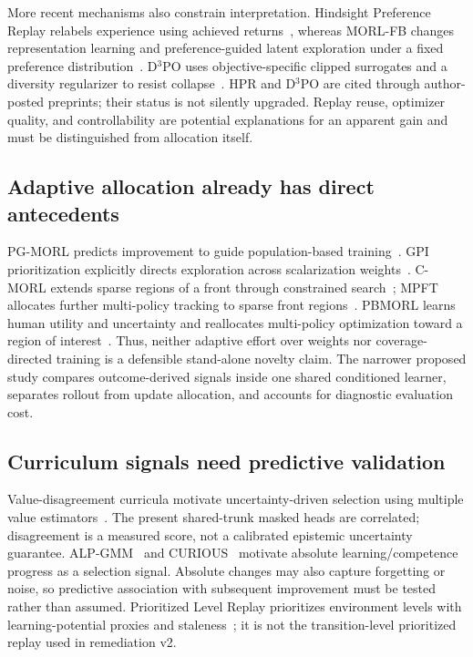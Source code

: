 More recent mechanisms also constrain interpretation. Hindsight Preference
Replay relabels experience using achieved returns~\cite{shianifar2026hpr},
whereas MORL-FB changes representation learning and preference-guided latent
exploration under a fixed preference distribution~\cite{chen2026morl-fb}.
D$^3$PO uses objective-specific clipped surrogates and a diversity regularizer
to resist collapse~\cite{ambadkar2026d3po}. HPR and D$^3$PO are cited through
author-posted preprints; their status is not silently upgraded. Replay reuse,
optimizer quality, and controllability are potential explanations for an
apparent gain and must be distinguished from allocation itself.

\subsection{Adaptive allocation already has direct antecedents}
PG-MORL predicts improvement to guide population-based training~\cite{xu2020pgmorl}.
GPI prioritization explicitly directs exploration across scalarization
weights~\cite{alegre2023gpi-prioritization}. C-MORL extends sparse regions of a
front through constrained search~\cite{liu2025cmorl}; MPFT allocates further
multi-policy tracking to sparse front regions~\cite{zhao2026mpft}.
PBMORL learns human utility and uncertainty and reallocates multi-policy
optimization toward a region of interest~\cite{hu2026pbmorl}.
Thus, neither adaptive effort over weights nor coverage-directed training is
a defensible stand-alone novelty claim. The narrower proposed study compares
outcome-derived signals inside one shared conditioned learner, separates rollout
from update allocation, and accounts for diagnostic evaluation cost.

\subsection{Curriculum signals need predictive validation}
Value-disagreement curricula motivate uncertainty-driven selection using
multiple value estimators~\cite{zhang2020value-disagreement}. The present shared-trunk
masked heads are correlated; disagreement is a measured score, not a calibrated
epistemic uncertainty guarantee. ALP-GMM~\cite{portelas2020alp-gmm} and
CURIOUS~\cite{colas2019curious} motivate absolute learning/competence progress
as a selection signal. Absolute changes may also capture forgetting or noise,
so predictive association with subsequent improvement must be tested rather
than assumed. Prioritized Level Replay prioritizes environment levels with
learning-potential proxies and staleness~\cite{jiang2021plr}; it is not the
transition-level prioritized replay used in remediation v2.

